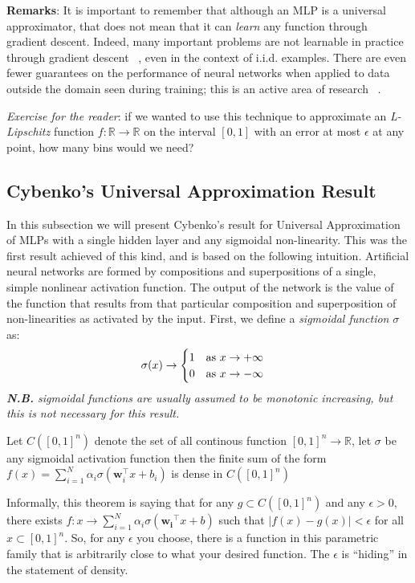 \documentclass{article}
\begin{document}
\textbf{Remarks}: It is important to remember that although an MLP is a universal approximator, that does not mean that it can \textit{learn} any function through gradient descent. Indeed, many important problems are not learnable in practice through gradient descent ~\citep{failures2017shalevshwartz}, even in the context of i.i.d. examples. There are even fewer guarantees on the performance of neural networks when applied to data outside the domain seen during training; this is an active area of research ~\citep{xu2021neural}.

\textit{Exercise for the reader}: if we wanted to use this technique to approximate an \textit{L-Lipschitz} function $f: \mathbb{R} \rightarrow \mathbb{R}$ on the interval $[0, 1]$ with an error at most $\epsilon$ at any point, how many bins would we need?  


\subsection{Cybenko's Universal Approximation Result}
In this subsection we will present Cybenko's \cite{cybenko1989approximation} result for Universal Approximation of MLPs with a single hidden layer and any sigmoidal non-linearity. This was the first result achieved of this kind, and is based on the following intuition. Artificial neural networks are formed by compositions and superpositions of a single, simple nonlinear activation function. The output of the network is the value of the function that results from that particular composition and superposition of non-linearities as activated by the input. First, we define a \textit{sigmoidal function} $\sigma$ as:
$$
\sigma(x) \to
\begin{cases}
1 \text{\quad as } x\to+\infty \\
0 \text{\quad as } x\to-\infty
\end{cases}
$$
\textit{\textbf{N.B.} sigmoidal functions are usually assumed to be monotonic increasing, but this is not necessary for this result.}

\begin{thm}
Let $C([0,1]^n)$ denote the set of all continous function $[0, 1]^n \to \mathbb{R}$, let $\sigma$ be any sigmoidal activation function then the finite sum of the form   
$f(x) = \sum_{i=1}^{N} \alpha_i \sigma(\mathbf{w}_i^\top x + b_i)$ is dense in $C([0,1]^n)$
\end{thm}

Informally, this theorem is saying that for any $g \subset C([0,1]^n)$ and any $\epsilon >0$, there exists $f: x \rightarrow \sum_{i=1}^{N} \alpha_i \sigma(\mathbf{w_i}^\top x +b)$ such that $|f(x)-g(x)|<\epsilon$ for all $x \subset [0,1]^n$. So, for any $\epsilon$ you choose, there is a function in this parametric family that is arbitrarily close to what your desired function. The $\epsilon$ is ``hiding'' in the statement of density.
\end{document}
